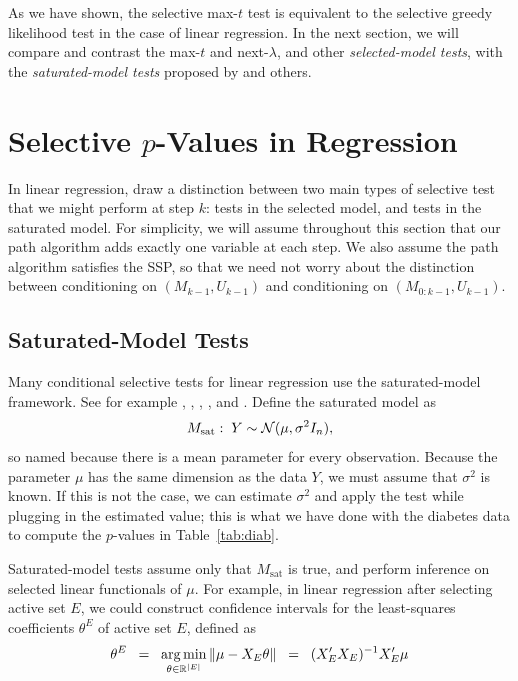 \documentclass{article}
\begin{document}
As we have shown, the selective max-$t$ test is equivalent to the selective greedy likelihood test in the case of linear regression. In the next section, we will compare and contrast the max-$t$ and next-$\lambda$, and other {\em selected-model tests}, with the {\em saturated-model tests} proposed by \citet{taylor2014exact} and others. 

\section{Selective $p$-Values in Regression}
\label{sec:selective-reg}
In linear regression, \citet{fithian2014optimal} draw a distinction between two main types of selective test that we might perform at step $k$: tests in the selected model, and tests in the saturated model. For simplicity, we will assume throughout this section that our path algorithm adds exactly one variable at each step. We also assume the path algorithm satisfies the SSP, so that we need not worry about the distinction between conditioning on $(M_{k-1}, U_{k-1})$ and conditioning on $(M_{0:k-1}, U_{k-1})$.

\subsection{Saturated-Model Tests}
Many conditional selective tests for linear regression use the saturated-model framework. See for example \citet{lockhart2014significance}, \citet{taylor2013tests}, \citet{taylor2014exact}, \citet{lee2013exact}, and \citet{loftus2014significance}. Define the saturated model as
\[
M_{\text{sat}}:\; Y \sim \mathcal{N}(\mu, \sigma^2I_n),
\]
so named because there is a mean parameter for every observation. Because the parameter $\mu$ has the same dimension as the data $Y$, we must assume that $\sigma^2$ is known. If this is not the case, we can estimate $\sigma^2$ and apply the test while plugging in the estimated value; this is what we have done with the diabetes data to compute the $p$-values in Table~\ref{tab:diab}.

Saturated-model tests assume only that $M_{\text{sat}}$ is true, and perform inference on selected linear functionals of $\mu$. For example, in linear regression after selecting active set $E$, we could construct confidence intervals for the least-squares coefficients $\theta^E$ of active set $E$, defined as
\[
\theta^E \;\;=\;\; \operatorname*{arg\,min}_{\theta\in\mathbb{R}^{|E|}} \|\mu - X_E\theta\| \;\;=\;\; (X_E'X_E)^{-1}X_E'\mu
\]
\end{document}
